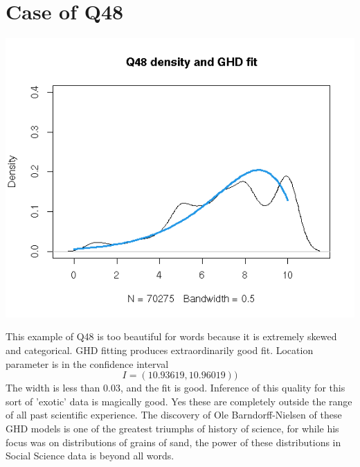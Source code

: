 \documentclass{amsart}
\begin{document}
\section{Case of Q48}

\includegraphics[scale=0.8]{ghdq48.png}

This example of Q48 is too beautiful for words because it is extremely skewed and categorical.  GHD fitting produces extraordinarily good fit.  Location parameter is in the confidence interval 
\[
I = (10.93619,10.96019) )
\]
The width is less than 0.03, and the fit is good.  Inference of this quality for this sort of 'exotic' data is magically good.  Yes these are completely outside the range of all past scientific experience.  The discovery of Ole Barndorff-Nielsen of these GHD models is one of the greatest triumphs of history of science, for while his focus was on distributions of grains of sand, the power of these distributions in Social Science data is beyond all words.
\end{document}
